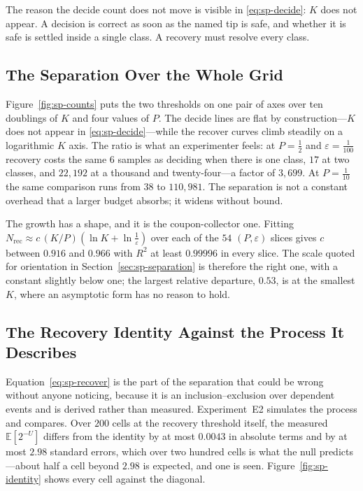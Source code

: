 The reason the decide count does not move is visible in \eqref{eq:sp-decide}: $K$ does not appear.
A decision is correct as soon as the named tip is safe, and whether it is safe is settled
inside a single class. A recovery must resolve every class.

\subsection{The Separation Over the Whole Grid}

Figure~\ref{fig:sp-counts} puts the two thresholds on one pair of axes over ten doublings of
$K$ and four values of $P$. The decide lines are flat by construction---$K$ does not appear in
\eqref{eq:sp-decide}---while the recover curves climb steadily on a logarithmic $K$ axis. The
ratio is what an experimenter feels: at $P=\tfrac12$ and $\varepsilon=\tfrac1{100}$ recovery
costs the same $6$ samples as deciding when there is one class, $17$ at two classes, and
$22{,}192$ at a thousand and twenty-four---a factor of $3{,}699$. At $P=\tfrac1{10}$ the same
comparison runs from $38$ to $110{,}981$. The separation is not a constant overhead that a
larger budget absorbs; it widens without bound. \NUM{}

The growth has a shape, and it is the coupon-collector one. Fitting
$N_{\mathrm{rec}}\approx c\,(K/P)(\ln K+\ln\tfrac1\varepsilon)$ over each of the $54$
$(P,\varepsilon)$ slices gives $c$ between $0.916$ and $0.966$ with $R^{2}$ at least
$0.99996$ in every slice. The scale quoted for orientation in Section~\ref{sec:sp-separation} is
therefore the right one, with a constant slightly below one; the largest relative departure,
$0.53$, is at the smallest $K$, where an asymptotic form has no reason to hold. \NUM{}

\subsection{The Recovery Identity Against the Process It Describes}

Equation~\eqref{eq:sp-recover} is the part of the separation that could be wrong without anyone
noticing, because it is an inclusion--exclusion over dependent events and is derived rather
than measured. Experiment~E2 simulates the process and compares. Over $200$ cells at the
recovery threshold itself, the measured $\mathbb{E}[2^{-U}]$ differs from the identity by at
most $0.0043$ in absolute terms and by at most $2.98$ standard errors, which over two hundred
cells is what the null predicts---about half a cell beyond $2.98$ is expected, and one is
seen.
Figure~\ref{fig:sp-identity} shows every cell against the diagonal. \NUM{}

